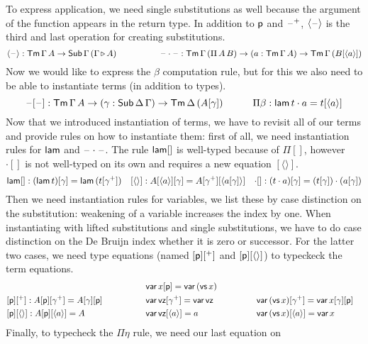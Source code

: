 \documentclass{easychair}
\begin{document}
To express application, we need single substitutions as well because
the argument of the function appears in the return type. In addition
to $\mathsf{p}$ and $\mathord{\hspace{1pt}\text{--}\hspace{1pt}}^+$, $\langle\mathord{\hspace{1pt}\text{--}\hspace{1pt}}\rangle$ is the third and last
operation for creating substitutions.
\[
\langle\mathord{\hspace{1pt}\text{--}\hspace{1pt}}\rangle : \mathsf{Tm}\,\Gamma\,A\rightarrow\mathsf{Sub}\,\Gamma\,(\Gamma\mathop{\triangleright} A) \hspace{5em} \mathord{\hspace{1pt}\text{--}\hspace{1pt}}\cdot\mathord{\hspace{1pt}\text{--}\hspace{1pt}}: \mathsf{Tm}\,\Gamma\,(\Pi\,A\,B)\rightarrow(a:\mathsf{Tm}\,\Gamma\,A)\rightarrow\mathsf{Tm}\,\Gamma\,(B[\langle a\rangle])
\]
Now we would like to express the $\beta$ computation rule, but for
this we also need to be able to instantiate terms (in addition to
types).
\[
\mathord{\hspace{1pt}\text{--}\hspace{1pt}}[\mathord{\hspace{1pt}\text{--}\hspace{1pt}}] : \mathsf{Tm}\,\Gamma\,A\rightarrow(\gamma:\mathsf{Sub}\,\Delta\,\Gamma)\rightarrow\mathsf{Tm}\,\Delta\,(A[\gamma]) \hspace{3em} \Pi\beta : \mathsf{lam}\,t\cdot a = t[\langle a\rangle] 
\]
Now that we introduced instantiation of terms, we have to revisit all
of our terms and provide rules on how to instantiate them: first of
all, we need instantiation rules for $\mathsf{lam}$ and
$\mathord{\hspace{1pt}\text{--}\hspace{1pt}}\cdot\mathord{\hspace{1pt}\text{--}\hspace{1pt}}$. The rule $\mathsf{lam}[]$ is well-typed because of
$\Pi[]$, however ${\cdot}[]$ is not well-typed on its own and requires
a new equation $[\langle\rangle]$.
\[
\mathsf{lam}[] : (\mathsf{lam}\,t)[\gamma] = \mathsf{lam}\,(t[\gamma^+]) \hspace{1em} [\langle\rangle] : A[\langle a\rangle][\gamma] = A[\gamma^+][\langle a[\gamma]\rangle] \hspace{1em} {\cdot}[] : (t\cdot a)[\gamma] = (t[\gamma])\cdot(a[\gamma])
\]
Then we need instantiation rules for variables, we list these by case
distinction on the substitution: weakening of a variable increases the
index by one. When instantiating with lifted substitutions and single
substitutions, we have to do case distinction on the De Bruijn index
whether it is zero or successor. For the latter two cases, we need
type equations (named $[\mathsf{p}][^+]$ and $[\mathsf{p}][\langle\rangle]$) to
typeckeck the term equations.\vspace{-1.5em}
\begin{alignat*}{10}
  & && \var\,x[\p] = \var\,(\vs\,x) \\
  & [\p][^+] : A[\p][\gamma^+] = A[\gamma][\p] \hspace{4em}&& \var\,\vz[\gamma^+] = \var\,\vz \hspace{4em} && \var\,(\vs\,x)[\gamma^+] = \var\,x[\gamma][\p] \\
  & [\p][\langle\rangle] : A[\p][\langle a\rangle] = A && \var\,\vz[\langle a\rangle] = a &&  \var\,(\vs\,x)[\langle a\rangle] = \var\,x
\end{alignat*}
Finally, to typecheck the $\Pi\eta$ rule, we need our last equation on
\end{document}
